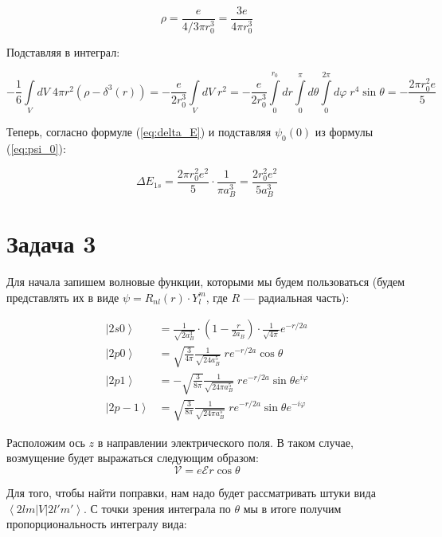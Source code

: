 \documentclass[a4paper, 12pt]{article}
\renewcommand{\phi}{\varphi} %
\newcommand{\bra}[1]
{\ensuremath{\left\langle#1\right|}}
\newcommand{\cat}[1]
{\ensuremath{\left|#1\right\rangle}}
\begin{document}
\begin{equation*}
	\rho = \frac{e}{4/3 \pi r_0^3} = \frac{3e}{4\pi r_0^3}
\end{equation*}

Подставляя в интеграл:

\begin{equation*}
	-\frac{1}{6} \int\limits_V dV \; 4\pi r^2 (\rho - \delta^3(r)) = -\frac{e}{2r_0^3}\int\limits_V dV \; r^2 = -\frac{e}{2r_0^3} \int\limits_{0}^{r_0} dr \int\limits_{0}^{\pi} d\theta \int\limits_{0}^{2\pi} d\phi \; r^4 \sin\theta = - \frac{2\pi r_0^2 e}{5}
\end{equation*}

Теперь, согласно формуле (\ref{eq:delta_E}) и подставляя $\psi_0(0)$ из формулы (\ref{eq:psi_0}):

\begin{equation*}
	\Delta E_{1s} = \frac{2\pi r_0^2 e^2}{5} \cdot \frac{1}{\pi a_B^3} = \boxed{\frac{2r_0^2 e^2}{5 a_B^3}}
\end{equation*}

\section*{Задача 3}

Для начала запишем волновые функции, которыми мы будем пользоваться (будем представлять их в виде $\psi = R_{nl}(r) \cdot Y_{l}^m$, где $R$ --- радиальная часть):

\begin{align*}
	\cat{2s0} &= \frac{1}{\sqrt{2 a_B^3}} \cdot \left(1 - \frac{r}{2a_B}\right) \cdot \frac{1}{\sqrt{4\pi}}e^{-r/2a}\\
	\cat{2p0} &= \sqrt{\frac{3}{4\pi}} \frac{1}{\sqrt{24 a_B^5}}\; r e^{-r/2a} \cos\theta\\
	\cat{2p1} &= -\sqrt{\frac{3}{8\pi}} \frac{1}{\sqrt{24 \pi a_B^5}} \; r e^{-r/2a} \sin \theta e^{i\phi}\\
	\cat{2p-1} &= \sqrt{\frac{3}{8\pi}} \frac{1}{\sqrt{24 \pi a_B^5}} \; r e^{-r/2a} \sin \theta e^{-i\phi}
\end{align*}

Расположим ось $z$ в направлении электрического поля. В таком случае, возмущение будет выражаться следующим образом:
\begin{equation*}
	\mathcal{V} = e \mathcal{E} r \cos \theta
\end{equation*}

Для того, чтобы найти поправки, нам надо будет рассматривать штуки вида $\bra{2lm}V\cat{2l'm'}$. С точки зрения интеграла по $\theta$ мы в итоге получим пропорциональность интегралу вида:
\end{document}
